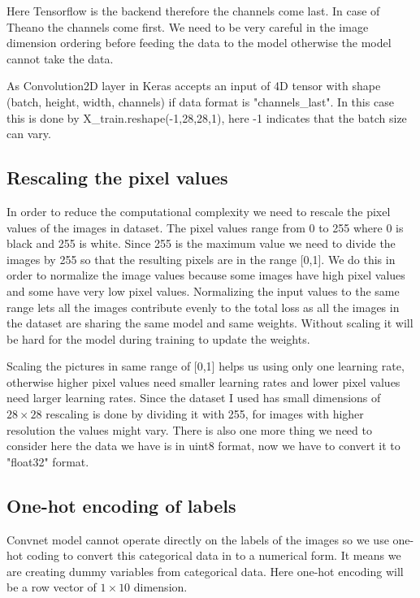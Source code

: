 Here Tensorflow is the backend therefore the channels come last. In case of Theano the channels come first. We need to be very careful in the image dimension ordering before feeding the data to the model otherwise the model cannot take the data.


\noindent As Convolution2D layer in Keras accepts an input of 4D tensor with shape (batch, height, width, channels) if data format is "channels\_last". In this case this is done by  X\_train.reshape(-1,28,28,1), here -1 indicates that the batch size can vary. 

\subsection{Rescaling the pixel values}

In order to reduce the computational complexity we need to rescale the pixel values of the images in dataset. The pixel values range from 0 to 255 where 0 is black and 255 is white. Since 255 is the maximum value we need to divide the images by 255 so that the resulting pixels are in the range [0,1]. 
\newpage\noindent We do this in order to normalize the image values because some images have high pixel values and some have very low pixel values. Normalizing the input values to the same range lets all the images contribute evenly to the total loss as all the images in the dataset are sharing the same model and same weights. Without scaling it will be hard for the model during training to update the weights.

Scaling the pictures in same range of [0,1] helps us using only one learning rate, otherwise higher pixel values need smaller learning rates and lower pixel values need larger learning rates. Since the dataset I used has small dimensions of $28\times28$ rescaling is done by dividing it with 255, for images with higher resolution the values might vary. There is also one more thing we need to consider here the data we have is in uint8 format, now we have to convert it to "float32" format.

\subsection{One-hot encoding of labels}

Convnet model cannot operate directly on the labels of the images so we use one-hot coding to convert this categorical data in to a numerical form. It means we are creating dummy variables from categorical data. Here one-hot encoding will be a row vector of $ 1\times10 $ dimension.

